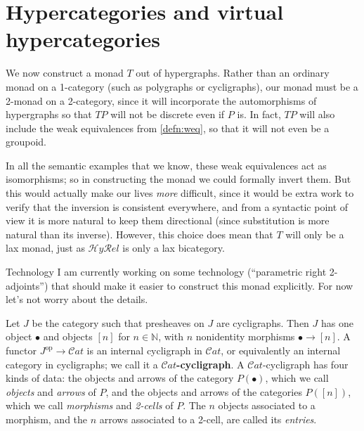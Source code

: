 \documentclass{article}
\theoremstyle{definition}
\theoremstyle{remark}
\def\Cat{\ensuremath{\mathcal{C}\mathit{at}}}
\def\op{^{\mathrm{op}}}
\def\N{\mathbb{N}}
\def\hyrel{\mathcal{H}\mathit{y}\mathcal{R}\mathit{el}}
\begin{document}
\section{Hypercategories and virtual hypercategories}
\label{sec:hypercats}

We now construct a monad $T$ out of hypergraphs.
Rather than an ordinary monad on a 1-category (such as polygraphs or cycligraphs), our monad must be a 2-monad on a 2-category, since it will incorporate the automorphisms of hypergraphs so that $T P$ will not be discrete even if $P$ is.
In fact, $T P$ will also include the weak equivalences from \cref{defn:weq}, so that it will not even be a groupoid.

In all the semantic examples that we know, these weak equivalences act as isomorphisms; so in constructing the monad we could formally invert them.
But this would actually make our lives \emph{more} difficult, since it would be extra work to verify that the inversion is consistent everywhere, and from a syntactic point of view it is more natural to keep them directional (since substitution is more natural than its inverse).
However, this choice does mean that $T$ will only be a lax monad, just as $\hyrel$ is only a lax bicategory.

\begin{anfxnote}{Technology}
  I am currently working on some technology (``parametric right 2-adjoints'') that should make it easier to construct this monad explicitly.
  For now let's not worry about the details.
\end{anfxnote}

Let $J$ be the category such that presheaves on $J$ are cycligraphs.
Then $J$ has one object $\bullet$ and objects $[n]$ for $n\in\N$, with $n$ nonidentity morphisms $\bullet\to [n]$.
A functor $J\op\to\Cat$ is an internal cycligraph in \Cat, or equivalently an internal category in cycligraphs; we call it a \textbf{\Cat-cycligraph}.
A \Cat-cycligraph has four kinds of data: the objects and arrows of the category $P(\bullet)$, which we call \emph{objects} and \emph{arrows} of $P$, and the objects and arrows of the categories $P([n])$, which we call \emph{morphisms} and \emph{2-cells} of $P$.
The $n$ objects associated to a morphism, and the $n$ arrows associated to a 2-cell, are called its \emph{entries}.
\end{document}
